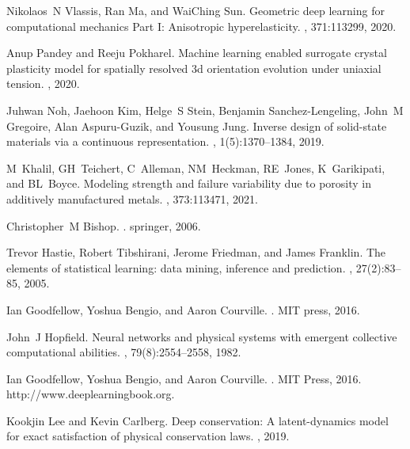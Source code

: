 \documentclass[12pt,reqno]{article}
\begin{document}
\begin{thebibliography}{10}
Nikolaos~N Vlassis, Ran Ma, and WaiChing Sun.
\newblock Geometric deep learning for computational mechanics {P}art {I}:
{A}nisotropic hyperelasticity.
,
371:113299, 2020.

Anup Pandey and Reeju Pokharel.
\newblock Machine learning enabled surrogate crystal plasticity model for
spatially resolved 3d orientation evolution under uniaxial tension.
, 2020.

Juhwan Noh, Jaehoon Kim, Helge~S Stein, Benjamin Sanchez-Lengeling, John~M
Gregoire, Alan Aspuru-Guzik, and Yousung Jung.
\newblock Inverse design of solid-state materials via a continuous
representation.
, 1(5):1370--1384, 2019.

M~Khalil, GH~Teichert, C~Alleman, NM~Heckman, RE~Jones, K~Garikipati, and
BL~Boyce.
\newblock Modeling strength and failure variability due to porosity in
additively manufactured metals.
,
373:113471, 2021.

Christopher~M Bishop.
.
\newblock springer, 2006.

Trevor Hastie, Robert Tibshirani, Jerome Friedman, and James Franklin.
\newblock The elements of statistical learning: data mining, inference and
prediction.
, 27(2):83--85, 2005.

Ian Goodfellow, Yoshua Bengio, and Aaron Courville.
.
\newblock MIT press, 2016.

John~J Hopfield.
\newblock Neural networks and physical systems with emergent collective
computational abilities.
,
79(8):2554--2558, 1982.

Ian Goodfellow, Yoshua Bengio, and Aaron Courville.
.
\newblock MIT Press, 2016.
\newblock http://www.deeplearningbook.org.

Kookjin Lee and Kevin Carlberg.
\newblock Deep conservation: A latent-dynamics model for exact satisfaction of
physical conservation laws.
, 2019.


\end{thebibliography}
\end{document}
